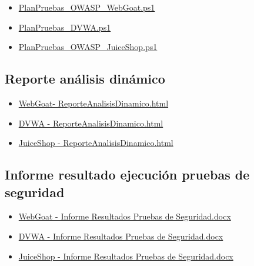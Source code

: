\begin{itemize}
    \item \href{https://github.com/M0l1n3ta/PFG/blob/master/Scripts/Plan%20Pruebas/PlanPruebas_OWASP_WebGoat.ps1}{PlanPruebas_OWASP_WebGoat.ps1}
    \item \href{https://github.com/M0l1n3ta/PFG/blob/master/Scripts/Plan%20Pruebas/PlanPruebas_DVWA.ps1}{PlanPruebas_DVWA.ps1}
    \item \href{https://github.com/M0l1n3ta/PFG/blob/master/Scripts/Plan%20Pruebas/PlanPruebas_OWASP_JuiceShop.ps1}{PlanPruebas_OWASP_JuiceShop.ps1}
\end{itemize}


\subsection{Reporte análisis dinámico}

\begin{itemize}
    \item \href{https://github.com/M0l1n3ta/PFG/blob/master/Reportes/03%20-%20An%C3%A1lisis%20din%C3%A1mico%20de%20c%C3%B3digo/WebGoat-%20ReporteAnalisisDinamico.html}{WebGoat- ReporteAnalisisDinamico.html}
    \item \href{https://github.com/M0l1n3ta/PFG/blob/master/Reportes/03%20-%20An%C3%A1lisis%20din%C3%A1mico%20de%20c%C3%B3digo/DVWA%20-%20ReporteAnalisisDinamico.html}{DVWA - ReporteAnalisisDinamico.html}
    \item \href{https://github.com/M0l1n3ta/PFG/blob/master/Reportes/03%20-%20An%C3%A1lisis%20din%C3%A1mico%20de%20c%C3%B3digo/JuiceShop%20-%20ReporteAnalisisDinamico.html}{JuiceShop - ReporteAnalisisDinamico.html}
\end{itemize}

\subsection{Informe resultado ejecución pruebas de seguridad}

\begin{itemize}
    \item \href{https://github.com/M0l1n3ta/PFG/blob/master/Reportes/04%20-%20PIR%20-%20Informe%20de%20Resultados/WebGoat%20-%20Informe%20Resultados%20Pruebas%20de%20Seguridad.docx}{WebGoat - Informe Resultados Pruebas de Seguridad.docx}
    \item \href{https://github.com/M0l1n3ta/PFG/blob/master/Reportes/04%20-%20PIR%20-%20Informe%20de%20Resultados/DVWA%20-%20Informe%20Resultados%20Pruebas%20de%20Seguridad.docx}{DVWA - Informe Resultados Pruebas de Seguridad.docx}
    \item \href{https://github.com/M0l1n3ta/PFG/blob/master/Reportes/04%20-%20PIR%20-%20Informe%20de%20Resultados/JuiceShop%20-%20Informe%20Resultados%20Pruebas%20de%20Seguridad.docx}{JuiceShop - Informe Resultados Pruebas de Seguridad.docx}
\end{itemize}
